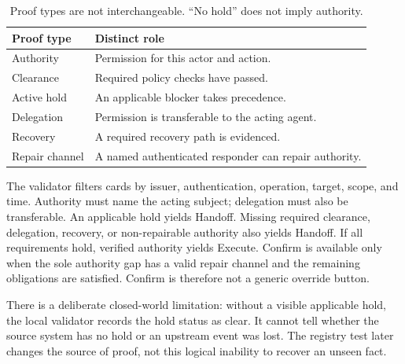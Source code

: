 \documentclass[10pt,twocolumn,letterpaper]{article}
\begin{document}
\begin{table}[t]
\centering\small
\begin{tabular}{@{}p{}p{}@{}}
\toprule
Proof type & Distinct role \\
\midrule
Authority & Permission for this actor and action. \\
Clearance & Required policy checks have passed. \\
Active hold & An applicable blocker takes precedence. \\
Delegation & Permission is transferable to the acting agent. \\
Recovery & A required recovery path is evidenced. \\
Repair channel & A named authenticated responder can repair authority. \\
\bottomrule
\end{tabular}
\caption{Proof types are not interchangeable. ``No hold'' does not imply authority.}
\label{tab:types}
\end{table}

The validator filters cards by issuer, authentication, operation, target, scope,
and time. Authority must name the acting subject; delegation must also be
transferable. An applicable hold yields Handoff. Missing required clearance,
delegation, recovery, or non-repairable authority also yields Handoff. If all
requirements hold, verified authority yields Execute. Confirm is available
only when the sole authority gap has a valid repair channel and the remaining
obligations are satisfied. Confirm is therefore not a generic override button.

There is a deliberate closed-world limitation: without a visible applicable
hold, the local validator records the hold status as clear. It cannot tell
whether the source system has no hold or an upstream event was lost. The
registry test later changes the source of proof, not this logical inability
to recover an unseen fact.
\end{document}
